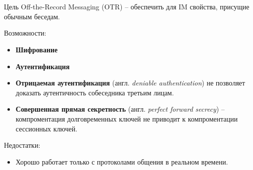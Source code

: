 \documentclass[presentation]{beamer}
\newcommand{\RaisedRightHand}{%
  \raisebox{-.50em}{\Large\HandRight}
}
\begin{document}


\section{}

\begin{frame}{}
  \RaisedRightHand Цель Off-the-Record Messaging (OTR) – обеспечить
  для IM свойства, присущие обычным беседам.

  Возможности:
  \begin{itemize}
  \item \textbf{Шифрование} 
  \item \textbf{Аутентификация}
  \item \textbf{Отрицаемая аутентификация} (англ. \textit{deniable
      authentication}) не позволяет доказать аутентичность собеседника
    третьим лицам.
  \item \textbf{Совершенная прямая секретность} (англ. \textit{perfect
      forward secrecy}) -- компроментация долговременных ключей не
    приводит к компроментации сессионных ключей.

  \end{itemize}
  Недостатки:
  \begin{itemize}
  \item Хорошо работает только с протоколами общения в
    реальном времени.
  \end{itemize}
\end{frame}
\end{document}
